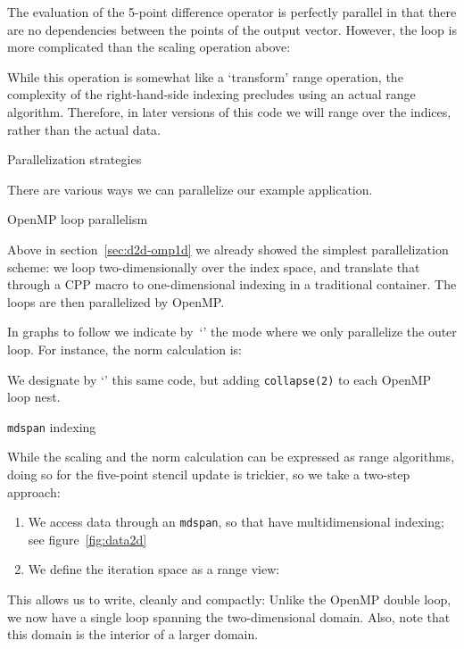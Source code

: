 The evaluation of the 5-point difference operator is perfectly parallel
in that there are no dependencies between the points of the output vector.
However, the loop is more complicated than the scaling operation above:
%

While this operation is somewhat like a `transform' range operation,
the complexity of the right-hand-side indexing precludes using
an actual range algorithm.
Therefore, in later versions of this code we will range over
the indices, rather than the actual data.


 {Parallelization strategies}

There are various ways we can parallelize our example application.

 {OpenMP loop parallelism}

Above in section~\ref{sec:d2d-omp1d}
we already showed the simplest parallelization scheme:
we loop two-dimensionally over the index space,
and translate that through a \ac{CPP} macro
to one-dimensional indexing in a traditional container.
The loops are then parallelized by OpenMP.

In graphs to follow we indicate by~`'
the mode where we only parallelize the outer loop.
For instance, the norm calculation is:
%

We designate by `' this same code, but adding
\lstinline[language=omp]{collapse(2)} to each OpenMP loop nest.

 {\texttt{mdspan} indexing}

While the scaling and the norm calculation can be expressed as range algorithms,
doing so for the five-point stencil update is trickier,
so we take a two-step approach:

  
\begin{enumerate}
\item We access data through an \lstinline{mdspan}, so that have multidimensional indexing;
  see figure~\ref{fig:data2d}

\begin{figure*}[h]
  \caption{Use of \texttt{mdspan} for 2D data access}
  \label{fig:data2d}
\end{figure*}

\item We define the iteration space as a  range view:


\end{enumerate}
This allows us to write, cleanly and compactly:
%
%
Unlike the OpenMP double loop, we now have a single loop
spanning the two-dimensional domain.
Also, note that this domain is the interior of a larger domain.

